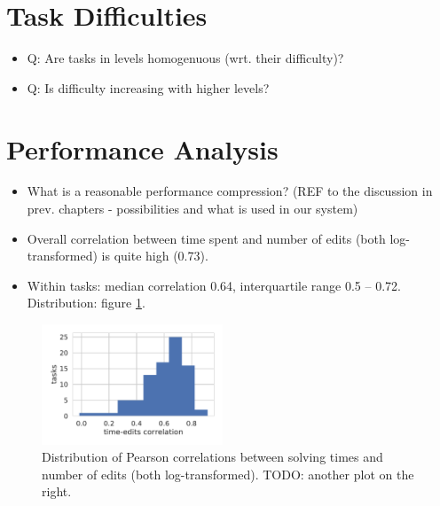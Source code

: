 \section{Task Difficulties}

\begin{itemize}
\item Q: Are tasks in levels homogenuous (wrt. their difficulty)?
\item Q: Is difficulty increasing with higher levels?
\end{itemize}



\section{Performance Analysis}

\begin{itemize}
\item What is a reasonable performance compression?
  (REF to the discussion in prev. chapters - possibilities and what is used in
  our system)
\item Overall correlation between time spent and number of edits (both log-transformed)
  is quite high (0.73).
\item Within tasks: median correlation 0.64, interquartile range 0.5 -- 0.72.
  Distribution: figure \ref{fig:time-vs-edits}.
\end{itemize}

\begin{figure}[htb]
\begin{center}
  \includegraphics[width=0.48\textwidth]{img/time-edits-corr}
\end{center}
\caption{%
  Distribution of Pearson correlations between solving times and number of edits
  (both log-transformed). TODO: another plot on the right.}
\label{fig:time-vs-edits}
\end{figure}

